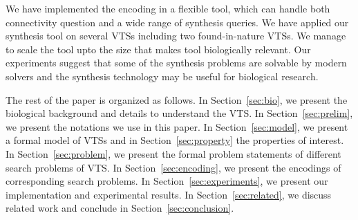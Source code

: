 \par We have implemented the encoding in a flexible tool, which can handle both connectivity question and a wide range of synthesis queries. 
%
%
We have applied our synthesis tool on several VTSs including
two found-in-nature VTSs.
%
We manage to scale the tool upto the size that makes tool biologically relevant. 
%
Our experiments suggest that some of the synthesis problems are solvable by modern solvers and the synthesis technology may be useful for biological research.
%

%
The rest of the paper is organized as follows. 
%
In Section~\ref{sec:bio}, we present the biological background and details to understand the VTS. 
%
In Section~\ref{sec:prelim}, we present the notations we use in this paper. 
%
In Section~\ref{sec:model}, we present a formal model of VTSs and in Section~\ref{sec:property} the properties of interest.
%
In Section~\ref{sec:problem}, we present the formal problem statements of different search problems of VTS.
%
In Section~\ref{sec:encoding}, we present the encodings of corresponding search problems. 
%
In Section~\ref{sec:experiments}, we present our implementation and experimental results. 
%
In Section~\ref{sec:related}, we discuss related work and conclude in Section~\ref{sec:conclusion}.
%
~        
